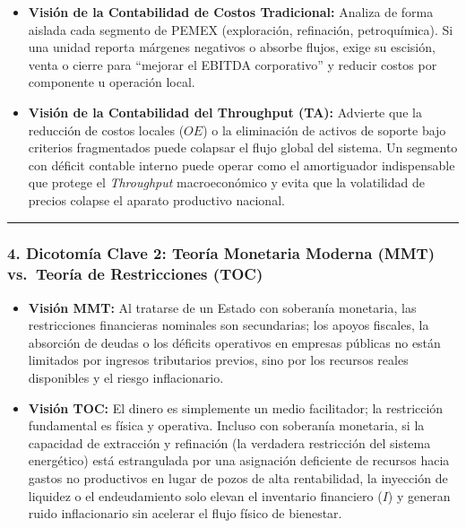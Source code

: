 \documentclass[12pt,letterpaper]{article}
\providecommand{\tightlist}{%
  \setlength{\itemsep}{0pt}\setlength{\parskip}{0pt}}
\begin{document}
\begin{itemize}
\tightlist
\item
  \textbf{Visión de la Contabilidad de Costos Tradicional:} Analiza de
  forma aislada cada segmento de PEMEX (exploración, refinación,
  petroquímica). Si una unidad reporta márgenes negativos o absorbe
  flujos, exige su escisión, venta o cierre para ``mejorar el EBITDA
  corporativo'' y reducir costos por componente u operación local.
\item
  \textbf{Visión de la Contabilidad del Throughput (TA):} Advierte que
  la reducción de costos locales (\(OE\)) o la eliminación de activos de
  soporte bajo criterios fragmentados puede colapsar el flujo global del
  sistema. Un segmento con déficit contable interno puede operar como el
  amortiguador indispensable que protege el \emph{Throughput}
  macroeconómico y evita que la volatilidad de precios colapse el
  aparato productivo nacional.
\end{itemize}

\begin{center}\rule{0.5\linewidth}{0.5pt}\end{center}

\hypertarget{dicotomuxeda-clave-2-teoruxeda-monetaria-moderna-mmt-vs.-teoruxeda-de-restricciones-toc}{%
\subsubsection{4. Dicotomía Clave 2: Teoría Monetaria Moderna (MMT)
vs.~Teoría de Restricciones
(TOC)}\label{dicotomuxeda-clave-2-teoruxeda-monetaria-moderna-mmt-vs.-teoruxeda-de-restricciones-toc}}

\begin{itemize}
\tightlist
\item
  \textbf{Visión MMT:} Al tratarse de un Estado con soberanía monetaria,
  las restricciones financieras nominales son secundarias; los apoyos
  fiscales, la absorción de deudas o los déficits operativos en empresas
  públicas no están limitados por ingresos tributarios previos, sino por
  los recursos reales disponibles y el riesgo inflacionario.
\item
  \textbf{Visión TOC:} El dinero es simplemente un medio facilitador; la
  restricción fundamental es física y operativa. Incluso con soberanía
  monetaria, si la capacidad de extracción y refinación (la verdadera
  restricción del sistema energético) está estrangulada por una
  asignación deficiente de recursos hacia gastos no productivos en lugar
  de pozos de alta rentabilidad, la inyección de liquidez o el
  endeudamiento solo elevan el inventario financiero (\(I\)) y generan
  ruido inflacionario sin acelerar el flujo físico de bienestar.
\end{itemize}
\end{document}
